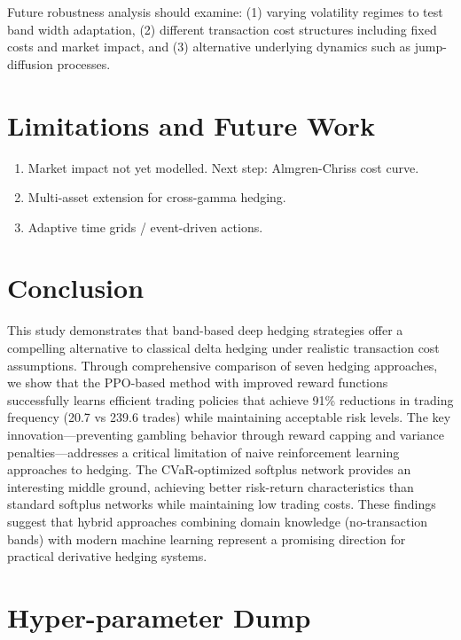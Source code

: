 \documentclass[11pt,letterpaper]{article}
\begin{document}
Future robustness analysis should examine: (1) varying volatility regimes to test band width adaptation, (2) different transaction cost structures including fixed costs and market impact, and (3) alternative underlying dynamics such as jump-diffusion processes.

\section{Limitations and Future Work}
\begin{enumerate}
  \item Market impact not yet modelled.  Next step: Almgren-Chriss cost curve.
  \item Multi-asset extension for cross-gamma hedging.
  \item Adaptive time grids / event-driven actions.
\end{enumerate}

\section{Conclusion}
\noindent
This study demonstrates that band-based deep hedging strategies offer a compelling alternative to classical delta hedging under realistic transaction cost assumptions. Through comprehensive comparison of seven hedging approaches, we show that the PPO-based method with improved reward functions successfully learns efficient trading policies that achieve 91\% reductions in trading frequency (20.7 vs 239.6 trades) while maintaining acceptable risk levels. The key innovation—preventing gambling behavior through reward capping and variance penalties—addresses a critical limitation of naive reinforcement learning approaches to hedging. The CVaR-optimized softplus network provides an interesting middle ground, achieving better risk-return characteristics than standard softplus networks while maintaining low trading costs. These findings suggest that hybrid approaches combining domain knowledge (no-transaction bands) with modern machine learning represent a promising direction for practical derivative hedging systems.

\appendix
\section{Hyper-parameter Dump}

\end{document}
